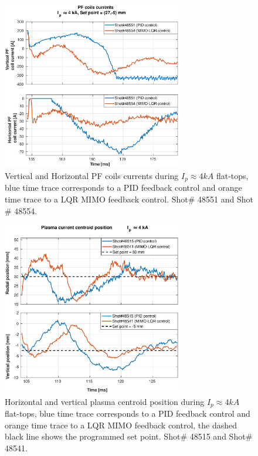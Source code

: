 \begin{figure}
	\centering
	\includegraphics[width=0.7\textwidth]{Chp5/PIDvsMIMO_551_554_curr_2.eps}
	\caption{   Vertical and Horizontal PF coils currents during  $I_p\approx 4kA$  flat-tops, blue time trace corresponds to a PID feedback control and orange time trace to a LQR MIMO feedback control.  Shot$\#$ 48551 and Shot$\#$ 48554.}
\end{figure}
\begin{figure}
	\centering
	\includegraphics[width=0.7\textwidth]{Chp5/PIDvsMIMO_515_541_2.eps}
	\caption{Horizontal and vertical plasma centroid position during  $I_p\approx 4kA$  flat-tops, blue time trace corresponds to a PID feedback control and orange time trace to a LQR MIMO feedback control, the dashed black line shows the programmed set point.  Shot$\#$ 48515 and Shot$\#$ 48541.}
\end{figure}

